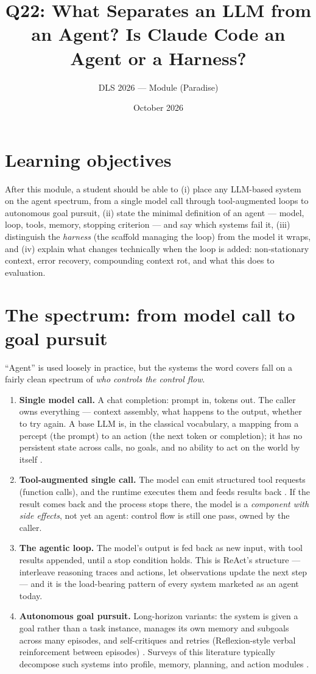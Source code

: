 \documentclass[11pt]{article}
\title{Q22: What Separates an LLM from an Agent? Is Claude Code an Agent or a Harness?}
\author{DLS 2026 --- Module (Paradise)}
\date{October 2026}
\begin{document}
\maketitle

\section*{Learning objectives}
After this module, a student should be able to (i) place any LLM-based system on the agent spectrum, from a single model call through tool-augmented loops to autonomous goal pursuit, (ii) state the minimal definition of an agent --- model, loop, tools, memory, stopping criterion --- and say which systems fail it, (iii) distinguish the \emph{harness} (the scaffold managing the loop) from the model it wraps, and (iv) explain what changes technically when the loop is added: non-stationary context, error recovery, compounding context rot, and what this does to evaluation.

\section{The spectrum: from model call to goal pursuit}
``Agent'' is used loosely in practice, but the systems the word covers fall on a fairly clean spectrum of \emph{who controls the control flow}.

\begin{enumerate}[noitemsep]
  \item \textbf{Single model call.} A chat completion: prompt in, tokens out. The caller owns everything --- context assembly, what happens to the output, whether to try again. A base LLM is, in the classical vocabulary, a mapping from a percept (the prompt) to an action (the next token or completion); it has no persistent state across calls, no goals, and no ability to act on the world by itself \cite{russell2021aima}.
  \item \textbf{Tool-augmented single call.} The model can emit structured tool requests (function calls), and the runtime executes them and feeds results back \cite{schick2023toolformer}. If the result comes back and the process stops there, the model is a \emph{component with side effects}, not yet an agent: control flow is still one pass, owned by the caller.
  \item \textbf{The agentic loop.} The model's output is fed back as new input, with tool results appended, until a stop condition holds. This is ReAct's structure --- interleave reasoning traces and actions, let observations update the next step \cite{yao2023react} --- and it is the load-bearing pattern of every system marketed as an agent today.
  \item \textbf{Autonomous goal pursuit.} Long-horizon variants: the system is given a goal rather than a task instance, manages its own memory and subgoals across many episodes, and self-critiques and retries (Reflexion-style verbal reinforcement between episodes) \cite{shinn2023reflexion}. Surveys of this literature typically decompose such systems into profile, memory, planning, and action modules \cite{wang2024survey}.
\end{enumerate}
\end{document}
